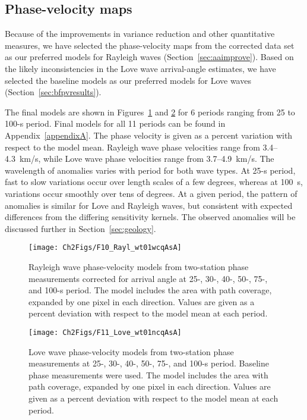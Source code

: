 \documentclass[12pt,oneside]{book}
\begin{document}
\subsection{Phase-velocity maps}

Because of the improvements in variance reduction and other quantitative measures, we have selected the phase-velocity maps from the corrected data set as our preferred models for Rayleigh waves (Section~\ref{sec:aaimprove}). Based on the likely inconsistencies in the Love wave arrival-angle estimates, we have selected the baseline models as our preferred models for Love waves (Section~\ref{sec:bfpvresults}). 

The final models are shown in Figures~\ref{figpv:pvmodels_R} and \ref{figpv:pvmodels_L} for 6 periods ranging from 25 to 100\nobreakdash-s period. Final models for all 11 periods can be found in Appendix~\ref{appendixA}. The phase velocity is given as a percent variation with respect to the model mean. Rayleigh wave phase velocities range from 3.4\nobreakdash--4.3~km/s, while Love wave phase velocities range from 3.7\nobreakdash--4.9~km/s. The wavelength of anomalies varies with period for both wave types. At 25\nobreakdash-s period, fast to slow variations occur over length scales of a few degrees, whereas at 100~s, variations occur smoothly over tens of degrees. At a given period, the pattern of anomalies is similar for Love and Rayleigh waves, but consistent with expected differences from the differing sensitivity kernels. The observed anomalies will be discussed further in Section~\ref{sec:geology}. 

\begin{figure} 
\begin{center}
\texttt{[image: Ch2Figs/F10\_Rayl\_wt01wcqAsA]} 
\caption[Rayleigh wave phase-velocity maps from corrected two-station measurements]{Rayleigh wave phase-velocity models from two-station phase measurements corrected for arrival angle at 25-, 30-, 40-, 50-, 75-, and 100-s period. The model includes the area with path coverage, expanded by one pixel in each direction. Values are given as a percent deviation with respect to the model mean at each period.}
\label{figpv:pvmodels_R}
\end{center}
\end{figure}
%
\begin{figure} 
\begin{center}
\texttt{[image: Ch2Figs/F11\_Love\_wt01ncqAsA]} 
\caption[Love wave phase-velocity maps from baseline two-station measurements]{Love wave phase-velocity models from two-station phase measurements at 25-, 30-, 40-, 50-, 75-, and 100-s period. Baseline phase measurements were used. The model includes the area with path coverage, expanded by one pixel in each direction. Values are given as a percent deviation with respect to the model mean at each period. }
\label{figpv:pvmodels_L}
\end{center}
\end{figure}
%
\end{document}
